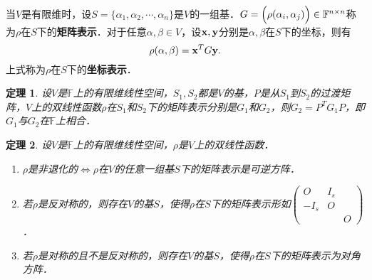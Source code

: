 \documentclass[a4paper,fontset=windows]{ctexbook}
\newtheorem{theorem}{定理}[chapter]
\theoremstyle{definition}
\begin{document}
当$V$是有限维时，设$S=\{\alpha_1,\alpha_2,\cdots,\alpha_n\}$是$V$的一组基．$G=\Bigl(\rho(\alpha_i,\alpha_j)\Bigr)\in\mathbb{F}^{n\times n}$称为$\rho$在$S$下的{\bf 矩阵表示}．对于任意$\alpha,\beta\in V$，设${\bf x,y}$分别是$\alpha,\beta$在$S$下的坐标，则有
$$\rho(\alpha,\beta)={\bf x}^TG{\bf y}.$$
上式称为$\rho$在$S$下的{\bf 坐标表示}．

\begin{theorem}\label{thm10.33}
设$V$是$\mathbb{F}$上的有限维线性空间，$S_1,S_2$都是$V$的基，$P$是从$S_1$到$S_2$的过渡矩阵，$V$上的双线性函数$\rho$在$S_1$和$S_2$下的矩阵表示分别是$G_1$和$G_2$，则$G_2=P^TG_1P$，即$G_1$与$G_2$在$\mathbb{F}$上相合．
\end{theorem}

\begin{theorem}
设$V$是$\mathbb{F}$上的有限维线性空间，$\rho$是$V$上的双线性函数．
\begin{enumerate}
\item $\rho$是非退化的$\Leftrightarrow\rho$在$V$的任意一组基$S$下的矩阵表示是可逆方阵．

\item 若$\rho$是反对称的，则存在$V$的基$S$，使得$\rho$在$S$下的矩阵表示形如$\begin{pmatrix}O&I_s& \\ -I_s&O& \\ &&O\end{pmatrix}$．

\item 若$\rho$是对称的且不是反对称的，则存在$V$的基$S$，使得$\rho$在$S$下的矩阵表示为对角方阵．
\end{enumerate}
\end{theorem}
\end{document}
